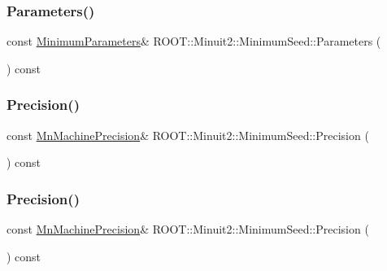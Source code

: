 \subsubsection{\texorpdfstring{Parameters()}{Parameters()}\hspace{0.1cm}{\footnotesize\ttfamily [3/3]}}
{\footnotesize\ttfamily const \mbox{\hyperlink{classROOT_1_1Minuit2_1_1MinimumParameters}{Minimum\+Parameters}}\& R\+O\+O\+T\+::\+Minuit2\+::\+Minimum\+Seed\+::\+Parameters (\begin{DoxyParamCaption}{ }\end{DoxyParamCaption}) const\hspace{0.3cm}{\ttfamily [inline]}}

\mbox{\label{classROOT_1_1Minuit2_1_1MinimumSeed_a0cc83616e61f2d3552cedf34ed09e361}} 
\subsubsection{\texorpdfstring{Precision()}{Precision()}\hspace{0.1cm}{\footnotesize\ttfamily [1/3]}}
{\footnotesize\ttfamily const \mbox{\hyperlink{classROOT_1_1Minuit2_1_1MnMachinePrecision}{Mn\+Machine\+Precision}}\& R\+O\+O\+T\+::\+Minuit2\+::\+Minimum\+Seed\+::\+Precision (\begin{DoxyParamCaption}{ }\end{DoxyParamCaption}) const\hspace{0.3cm}{\ttfamily [inline]}}

\mbox{\label{classROOT_1_1Minuit2_1_1MinimumSeed_a0cc83616e61f2d3552cedf34ed09e361}} 
\subsubsection{\texorpdfstring{Precision()}{Precision()}\hspace{0.1cm}{\footnotesize\ttfamily [2/3]}}
{\footnotesize\ttfamily const \mbox{\hyperlink{classROOT_1_1Minuit2_1_1MnMachinePrecision}{Mn\+Machine\+Precision}}\& R\+O\+O\+T\+::\+Minuit2\+::\+Minimum\+Seed\+::\+Precision (\begin{DoxyParamCaption}{ }\end{DoxyParamCaption}) const\hspace{0.3cm}{\ttfamily [inline]}}

